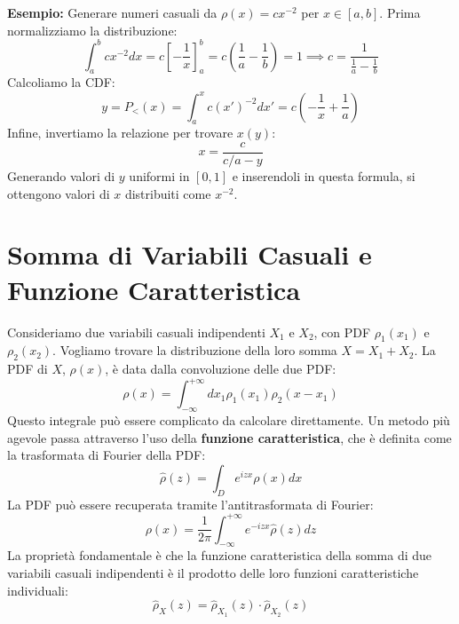 \textbf{Esempio:} Generare numeri casuali da $\rho(x) = cx^{-2}$ per $x \in [a,b]$.
Prima normalizziamo la distribuzione:
\begin{equation}
\int_a^b c x^{-2} dx = c \left[-\frac{1}{x}\right]_a^b = c\left(\frac{1}{a} - \frac{1}{b}\right) = 1 \implies c = \frac{1}{\frac{1}{a}-\frac{1}{b}}
\end{equation}
Calcoliamo la CDF:
\begin{equation}
y = P_<(x) = \int_a^x c(x')^{-2} dx' = c\left(-\frac{1}{x} + \frac{1}{a}\right)
\end{equation}
Infine, invertiamo la relazione per trovare $x(y)$:
\begin{equation}
x = \frac{c}{c/a - y}
\end{equation}
Generando valori di $y$ uniformi in $[0,1]$ e inserendoli in questa formula, si ottengono valori di $x$ distribuiti come $x^{-2}$.

\section{Somma di Variabili Casuali e Funzione Caratteristica}

Consideriamo due variabili casuali indipendenti $X_1$ e $X_2$, con PDF $\rho_1(x_1)$ e $\rho_2(x_2)$. Vogliamo trovare la distribuzione della loro somma $X = X_1 + X_2$. La PDF di $X$, $\rho(x)$, è data dalla convoluzione delle due PDF:
\begin{equation}
\rho(x) = \int_{-\infty}^{+\infty} dx_1 \rho_1(x_1) \rho_2(x-x_1)
\end{equation}
Questo integrale può essere complicato da calcolare direttamente. Un metodo più agevole passa attraverso l'uso della \textbf{funzione caratteristica}, che è definita come la trasformata di Fourier della PDF:
\begin{equation}
\hat{\rho}(z) = \int_D e^{izx} \rho(x) dx
\end{equation}
La PDF può essere recuperata tramite l'antitrasformata di Fourier:
\begin{equation}
\rho(x) = \frac{1}{2\pi} \int_{-\infty}^{+\infty} e^{-izx} \hat{\rho}(z) dz
\end{equation}
La proprietà fondamentale è che la funzione caratteristica della somma di due variabili casuali indipendenti è il prodotto delle loro funzioni caratteristiche individuali:
\begin{equation}
\hat{\rho}_X(z) = \hat{\rho}_{X_1}(z) \cdot \hat{\rho}_{X_2}(z)
\end{equation}

